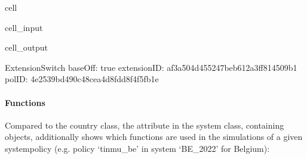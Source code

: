 \documentclass[letterpaper,10pt,english]{sphinxmanual}
\begin{document}
\begin{sphinxuseclass}{cell}
\begin{sphinxuseclass}{cell_input}
\begin{sphinxVerbatim}[commandchars=\\\{\}]
\PYG{p}{[}\PYG{p}{]}\PYG{p}{[}\PYG{p}{]}\PYG{p}{[}\PYG{p}{]}\PYG{p}{[}\PYG{p}{]}
\end{sphinxVerbatim}

\end{sphinxuseclass}
\begin{sphinxuseclass}{cell_output}
\begin{sphinxVerbatim}[commandchars=\\\{\}]
\PYGZhy{}\PYGZhy{}\PYGZhy{}\PYGZhy{}\PYGZhy{}\PYGZhy{}\PYGZhy{}\PYGZhy{}\PYGZhy{}\PYGZhy{}\PYGZhy{}\PYGZhy{}\PYGZhy{}\PYGZhy{}\PYGZhy{}\PYGZhy{}\PYGZhy{}\PYGZhy{}\PYGZhy{}\PYGZhy{}\PYGZhy{}\PYGZhy{}\PYGZhy{}\PYGZhy{}\PYGZhy{}\PYGZhy{}\PYGZhy{}\PYGZhy{}\PYGZhy{}\PYGZhy{}
ExtensionSwitch
\PYGZhy{}\PYGZhy{}\PYGZhy{}\PYGZhy{}\PYGZhy{}\PYGZhy{}\PYGZhy{}\PYGZhy{}\PYGZhy{}\PYGZhy{}\PYGZhy{}\PYGZhy{}\PYGZhy{}\PYGZhy{}\PYGZhy{}\PYGZhy{}\PYGZhy{}\PYGZhy{}\PYGZhy{}\PYGZhy{}\PYGZhy{}\PYGZhy{}\PYGZhy{}\PYGZhy{}\PYGZhy{}\PYGZhy{}\PYGZhy{}\PYGZhy{}\PYGZhy{}\PYGZhy{}
	 baseOff: \PYGZsq{}true\PYGZsq{}
	 extensionID: \PYGZsq{}af3a504d\PYGZhy{}4552\PYGZhy{}47be\PYGZhy{}b612\PYGZhy{}a3ff814509b1\PYGZsq{}
	 polID: \PYGZsq{}4e2539bd\PYGZhy{}490c\PYGZhy{}48ce\PYGZhy{}a4d8\PYGZhy{}fdd8f4f5fb1e\PYGZsq{}
\end{sphinxVerbatim}

\end{sphinxuseclass}
\end{sphinxuseclass}

\paragraph{Functions}
\label{\detokenize{notebooks/userguide:id5}}
\sphinxAtStartPar
Compared to the country class, the attribute  in the system class, containing  objects, additionally shows which functions are used in the simulations of a given system\sphinxhyphen{}policy (e.g. policy ‘tinmu\_be’ in system ‘BE\_2022’ for Belgium):
\end{document}
